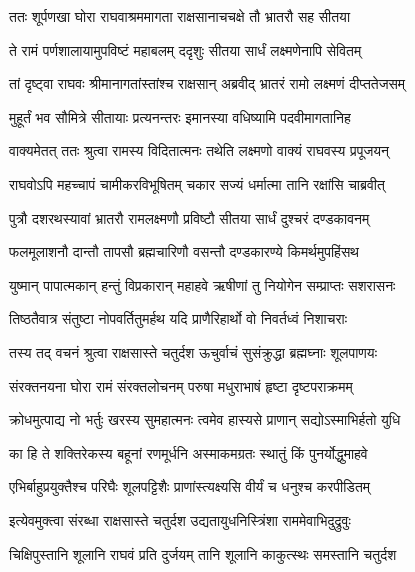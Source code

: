 
\twolineshloka
{ततः शूर्पणखा घोरा राघवाश्रममागता}
{राक्षसानाचचक्षे तौ भ्रातरौ सह सीतया} %

\twolineshloka
{ते रामं पर्णशालायामुपविष्टं महाबलम्}
{ददृशुः सीतया सार्धं लक्ष्मणेनापि सेवितम्} %

\twolineshloka
{तां दृष्ट्वा राघवः श्रीमानागतांस्तांश्च राक्षसान्}
{अब्रवीद् भ्रातरं रामो लक्ष्मणं दीप्ततेजसम्} %

\twolineshloka
{मुहूर्तं भव सौमित्रे सीतायाः प्रत्यनन्तरः}
{इमानस्या वधिष्यामि पदवीमागतानिह} %

\twolineshloka
{वाक्यमेतत् ततः श्रुत्वा रामस्य विदितात्मनः}
{तथेति लक्ष्मणो वाक्यं राघवस्य प्रपूजयन्} %

\twolineshloka
{राघवोऽपि महच्चापं चामीकरविभूषितम्}
{चकार सज्यं धर्मात्मा तानि रक्षांसि चाब्रवीत्} %

\twolineshloka
{पुत्रौ दशरथस्यावां भ्रातरौ रामलक्ष्मणौ}
{प्रविष्टौ सीतया सार्धं दुश्चरं दण्डकावनम्} %

\twolineshloka
{फलमूलाशनौ दान्तौ तापसौ ब्रह्मचारिणौ}
{वसन्तौ दण्डकारण्ये किमर्थमुपहिंसथ} %

\twolineshloka
{युष्मान् पापात्मकान् हन्तुं विप्रकारान् महाहवे}
{ऋषीणां तु नियोगेन सम्प्राप्तः सशरासनः} %

\twolineshloka
{तिष्ठतैवात्र संतुष्टा नोपवर्तितुमर्हथ}
{यदि प्राणैरिहार्थो वो निवर्तध्वं निशाचराः} %

\twolineshloka
{तस्य तद् वचनं श्रुत्वा राक्षसास्ते चतुर्दश}
{ऊचुर्वाचं सुसंक्रुद्धा ब्रह्मघ्नाः शूलपाणयः} %

\twolineshloka
{संरक्तनयना घोरा रामं संरक्तलोचनम्}
{परुषा मधुराभाषं हृष्टा दृष्टपराक्रमम्} %

\twolineshloka
{क्रोधमुत्पाद्य नो भर्तुः खरस्य सुमहात्मनः}
{त्वमेव हास्यसे प्राणान् सद्योऽस्माभिर्हतो युधि} %

\twolineshloka
{का हि ते शक्तिरेकस्य बहूनां रणमूर्धनि}
{अस्माकमग्रतः स्थातुं किं पुनर्योद्धुमाहवे} %

\twolineshloka
{एभिर्बाहुप्रयुक्तैश्च परिघैः शूलपट्टिशैः}
{प्राणांस्त्यक्ष्यसि वीर्यं च धनुश्च करपीडितम्} %

\twolineshloka
{इत्येवमुक्त्वा संरब्धा राक्षसास्ते चतुर्दश}
{उद्यतायुधनिस्त्रिंशा राममेवाभिदुद्रुवुः} %

\twolineshloka
{चिक्षिपुस्तानि शूलानि राघवं प्रति दुर्जयम्}
{तानि शूलानि काकुत्स्थः समस्तानि चतुर्दश} %

